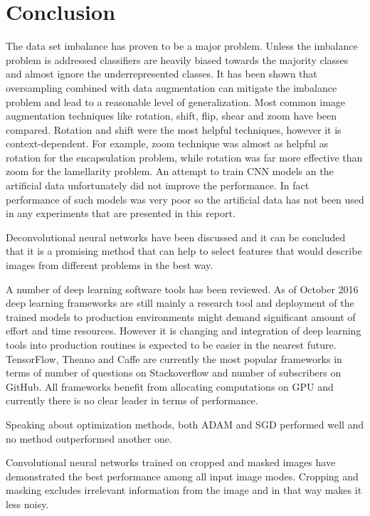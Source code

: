 \documentclass[a4paper, 11pt, table]{article}
\begin{document}
\newpage
\section{Conclusion}

The data set imbalance has proven to be a major problem. Unless the imbalance problem is addressed classifiers are heavily biased towards the majority classes and almost ignore the underrepresented classes. It has been shown that oversampling combined with data augmentation can mitigate the imbalance problem and lead to a reasonable level of generalization. Most common image augmentation techniques like rotation, shift, flip, shear and zoom have been compared. Rotation and shift were the most helpful techniques, however it is context-dependent. For example, zoom technique was almost as helpful as rotation for the encapsulation problem, while rotation was far more effective than zoom for the lamellarity problem. An attempt to train CNN models an the artificial data unfortunately did not improve the performance. In fact performance of such models was very poor so the artificial data has not been used in any experiments that are presented in this report. 

Deconvolutional neural networks have been discussed and it can be concluded that it is a promising method that can help to select features that would describe images from different problems in the best way.  

A number of deep learning software tools has been reviewed. As of October 2016 deep learning frameworks are still mainly a research tool and deployment of the trained models to production environments might demand significant amount of effort and time resources. However it is changing and integration of deep learning tools into production routines is expected to be easier in the nearest future. TensorFlow, Theano and Caffe are currently the most popular frameworks in terms of number of questions on Stackoverflow and number of subscribers on GitHub. All frameworks benefit from allocating computations on GPU and currently there is no clear leader in terms of performance. 

Speaking about optimization methods, both ADAM and SGD performed well and no method outperformed another one.

Convolutional neural networks trained on cropped and masked images have demonstrated the best performance among all input image modes. Cropping and masking excludes irrelevant information from the image and in that way makes it less noisy. 
\end{document}
